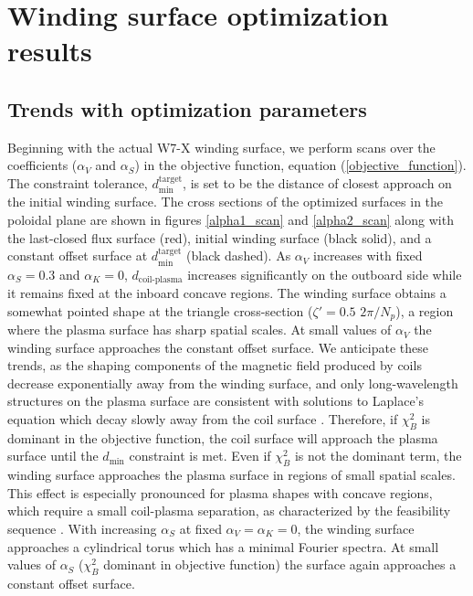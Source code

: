 \documentclass[aps,unsortedaddress]{revtex4-1}
\begin{document}
\section{Winding surface optimization results}
\label{sect_results}

\subsection{Trends with optimization parameters}
\FloatBarrier

Beginning with the actual W7-X winding surface, we perform scans over the coefficients ($\alpha_V$ and $\alpha_S$) in the objective function, equation (\ref{objective_function}). The constraint tolerance, $d_{\text{min}}^{\text{target}}$, is set to be the distance of closest approach on the initial winding surface. The cross sections of the optimized surfaces in the poloidal plane are shown in figures \ref{alpha1_scan} and \ref{alpha2_scan} along with the last-closed flux surface (red), initial winding surface (black solid), and a constant offset surface at $d_{\text{min}}^{\text{target}}$ (black dashed). As $\alpha_V$ increases with fixed $\alpha_S = 0.3$ and $\alpha_K = 0$, $d_{\text{coil-plasma}}$ increases significantly on the outboard side while it remains fixed at the inboard concave regions. The winding surface obtains a somewhat pointed shape at the triangle cross-section ($\zeta' = 0.5$ $2\pi/N_p$), a region where the plasma surface has sharp spatial scales. At small values of $\alpha_V$ the winding surface approaches the constant offset surface. We anticipate these trends, as the shaping components of the magnetic field produced by coils decrease exponentially away from the winding surface, and only long-wavelength structures on the plasma surface are consistent with solutions to Laplace's equation which decay slowly away from the coil surface \cite{Boozer2000}. Therefore, if $\chi^2_B$ is dominant in the objective function, the coil surface will approach the plasma surface until the $d_{\text{min}}$ constraint is met. Even if $\chi^2_B$ is not the dominant term, the winding surface approaches the plasma surface in regions of small spatial scales. This effect is especially pronounced for plasma shapes with concave regions, which require a small coil-plasma separation, as characterized by the feasibility sequence \cite{Landreman2016}. With increasing $\alpha_S$ at fixed $\alpha_V = \alpha_K = 0$, the winding surface approaches a cylindrical torus which has a minimal Fourier spectra. At small values of $\alpha_S$ ($\chi^2_B$ dominant in objective function) the surface again approaches a constant offset surface. 
\end{document}
